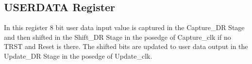 \subsection{USERDATA Register}
\label{subsec:userdata-reg}
In this register 8 bit user data input value is captured in the Capture\_DR Stage and then shifted in the Shift\_DR Stage in the posedge of Capture\_clk if no TRST and Reset is there. The shifted bits are updated to user data output in the Update\_DR Stage in the posedge of Update\_clk.
